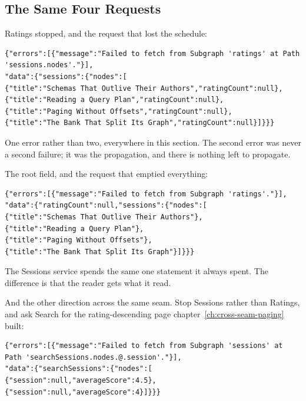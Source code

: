 \subsection{The Same Four Requests}

%
Ratings stopped, and the request that lost the schedule:

\begin{verbatim}
{"errors":[{"message":"Failed to fetch from Subgraph 'ratings' at Path 'sessions.nodes'."}],
"data":{"sessions":{"nodes":[
{"title":"Schemas That Outlive Their Authors","ratingCount":null},
{"title":"Reading a Query Plan","ratingCount":null},
{"title":"Paging Without Offsets","ratingCount":null},
{"title":"The Bank That Split Its Graph","ratingCount":null}]}}}
\end{verbatim}

%
One error rather than two, everywhere in this section. The second error was
never a second failure; it was the propagation, and there is nothing left to
propagate.

%
The root field, and the request that emptied everything:

\begin{verbatim}
{"errors":[{"message":"Failed to fetch from Subgraph 'ratings'."}],
"data":{"ratingCount":null,"sessions":{"nodes":[
{"title":"Schemas That Outlive Their Authors"},
{"title":"Reading a Query Plan"},
{"title":"Paging Without Offsets"},
{"title":"The Bank That Split Its Graph"}]}}}
\end{verbatim}

%
The Sessions service spends the same one statement it always spent. The
difference is that the reader gets what it read.

%
And the other direction across the same seam. Stop Sessions rather than
Ratings, and ask Search for the rating-descending page
chapter~\ref{ch:cross-seam-paging} built:

\begin{verbatim}
{"errors":[{"message":"Failed to fetch from Subgraph 'sessions' at Path 'searchSessions.nodes.@.session'."}],
"data":{"searchSessions":{"nodes":[
{"session":null,"averageScore":4.5},
{"session":null,"averageScore":4}]}}}
\end{verbatim}

